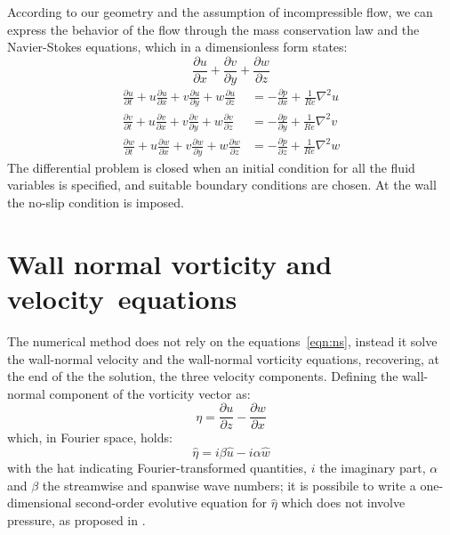 According to our geometry and the assumption of incompressible flow, we can express the behavior of the flow through the mass conservation law and the Navier-Stokes equations, which in a dimensionless form states:\\
\begin{equation}
\frac{\partial u}{\partial x} + \frac{\partial v}{\partial y} + \frac{\partial w}{\partial z}
\label{mass:cons}
\end{equation}
\begin{subequations}
\label{eqn:ns}
\begin{align}
\frac{\partial u}{\partial t} + u\frac{\partial u}{\partial x} + v\frac{\partial u}{\partial y} + w\frac{\partial u}{\partial z} &= 
- \frac{\partial p}{\partial x} + \frac{1}{Re} \nabla^{2}u  \\
\frac{\partial v}{\partial t} + u\frac{\partial v}{\partial x} + v\frac{\partial v}{\partial y} + w\frac{\partial v}{\partial z} &= 
- \frac{\partial p}{\partial y} + \frac{1}{Re}\nabla^{2}v\\
\frac{\partial w}{\partial t} + u\frac{\partial w}{\partial x} + v\frac{\partial w}{\partial y} + w\frac{\partial w}{\partial z} &= 
- \frac{\partial p}{\partial z} + \frac{1}{Re}\nabla^{2}w
\end{align}
\end{subequations}
The differential problem is closed when an initial condition for all the fluid variables is specified, and suitable boundary conditions are chosen. At the wall the no-slip condition is imposed.





\section{Wall normal vorticity and velocity~equations}
The numerical method does not rely on the equations~\eqref{eqn:ns}, instead it solve the wall-normal velocity and the wall-normal vorticity equations, recovering, at the end of the the solution, the three velocity components.
Defining the wall-normal component of the vorticity vector as:
\[
\eta = \frac{\partial u}{\partial z} - \frac{\partial w}{\partial x}
\]
which, in Fourier space, holds:
\[
\hat{\eta} = i\beta \hat{u} - i \alpha \hat{w}
\] 
with the hat indicating Fourier-transformed quantities, $i$ the imaginary part, $\alpha$ and $\beta$ the streamwise and spanwise wave numbers; it is possibile to write a one-dimensional second-order evolutive equation for $\hat{\eta}$ which does not involve pressure, as proposed in \cite{kim_moin_moser}.

